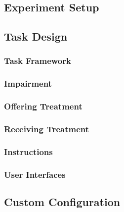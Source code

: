 \documentclass{article}
\begin{document}
\subsection*{Experiment Setup} %


\subsection*{Task Design}
\subsubsection*{Task Framework} %
\subsubsection*{Impairment} %
\subsubsection*{Offering Treatment} %
\subsubsection*{Receiving Treatment} %
\subsubsection*{Instructions} %
\subsubsection*{User Interfaces}


\subsection*{Custom Configuration} %
\end{document}
